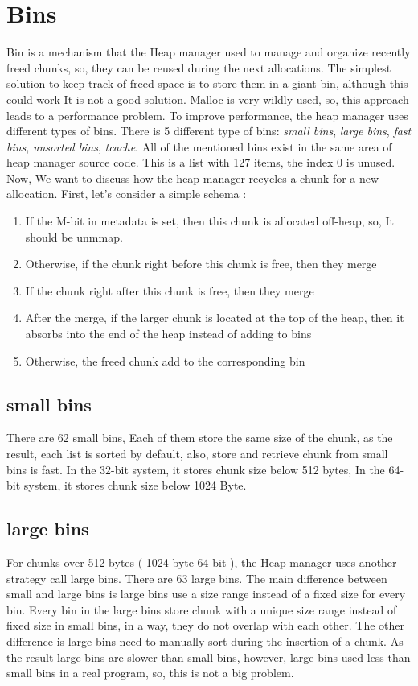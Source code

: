 \documentclass{masterthesis}
\newcommand*\tch{tcache}
\newcommand*\fb{fast bins}
\newcommand*\ub{unsorted bins}
\newcommand*\lb{large bins}
\newcommand*\sbs{small bins}
\begin{document}
\section{Bins}
	Bin is a mechanism that the Heap manager used to manage and organize recently freed chunks, so, they can be reused during the next allocations. The simplest solution to keep track of freed space is to store them in a giant bin, although this could work It is not a good solution. Malloc is very wildly used, so, this approach leads to a performance problem.
To improve performance, the heap manager uses different types of bins. There is 5 different type of bins: \emph{\sbs{}}, \emph{\lb{}}, \emph{\fb{}}, \emph{\ub{}}, \emph{\tch{}}. All of the mentioned bins exist in the same area of heap manager source code. This is a list with 127 items, the index 0 is unused. 
Now, We want to discuss how the heap manager recycles a chunk for a new allocation. First, let's consider a simple schema :
\begin{enumerate}
	\item If the M-bit in metadata is set, then this chunk is allocated off-heap, so, It should be unmmap.
	\item Otherwise, if the chunk right before this chunk is free, then they merge
	\item If the chunk right after this chunk is free, then they merge
	\item After the merge, if the larger chunk is located at the top of the heap, then it absorbs into the end of the heap instead of adding to bins
	\item Otherwise, the freed chunk add to the corresponding bin
\end{enumerate}

\subsection{\sbs{}}
There are 62 \sbs{}, Each of them store the same size of the chunk, as the result, each list is sorted by default, also, store and retrieve chunk from \sbs{} is fast. In the 32-bit system, it stores chunk size below 512 bytes, In the 64-bit system, it stores chunk size below 1024 Byte. 

\subsection{\lb{}}
For chunks over 512 bytes ( 1024 byte 64-bit ), the Heap manager uses another strategy call \lb{}. There are 63 \lb{}. The main difference between small and \lb{} is \lb{} use a size range instead of a fixed size for every bin. Every bin in the \lb{} store chunk with a unique size range instead of fixed size in \sbs{}, in a way, they do not overlap with each other.
The other difference is \lb{} need to manually sort during the insertion of a chunk. As the result \lb{} are slower than \sbs{}, however, \lb{} used less than \sbs{} in a real program, so, this is not a big problem.
\end{document}

